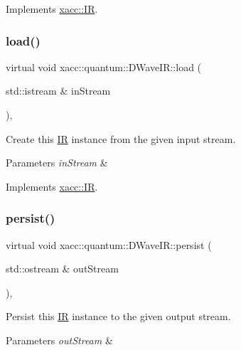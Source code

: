 Implements \hyperlink{a02480_a6f49b4ba4b3a15142b04873284885f0d}{xacc\+::\+IR}.

\mbox{\label{a01268_a94d814172ec30c7ed32e6ab52bc2a41a}} 
\subsubsection{\texorpdfstring{load()}{load()}}
{\footnotesize\ttfamily virtual void xacc\+::quantum\+::\+D\+Wave\+I\+R\+::load (\begin{DoxyParamCaption}\item[{std\+::istream \&}]{in\+Stream }\end{DoxyParamCaption})\hspace{0.3cm}{\ttfamily [inline]}, {\ttfamily [virtual]}}

Create this \hyperlink{a02480}{IR} instance from the given input stream.


\begin{DoxyParams}{Parameters}
{\em in\+Stream} & \\
\hline
\end{DoxyParams}


Implements \hyperlink{a02480_a444c2e4dc0faac500fb70fa93997e9bc}{xacc\+::\+IR}.

\mbox{\label{a01268_adac268c6fa2234902efeb9b3c07c0ac2}} 
\subsubsection{\texorpdfstring{persist()}{persist()}}
{\footnotesize\ttfamily virtual void xacc\+::quantum\+::\+D\+Wave\+I\+R\+::persist (\begin{DoxyParamCaption}\item[{std\+::ostream \&}]{out\+Stream }\end{DoxyParamCaption})\hspace{0.3cm}{\ttfamily [inline]}, {\ttfamily [virtual]}}

Persist this \hyperlink{a02480}{IR} instance to the given output stream.


\begin{DoxyParams}{Parameters}
{\em out\+Stream} & \\
\hline
\end{DoxyParams}


